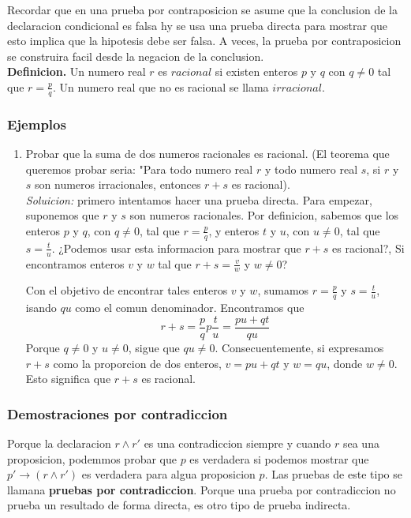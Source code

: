 \documentclass[]{article}
\begin{document}
Recordar que en una prueba por contraposicion se asume que la conclusion de la declaracion condicional es falsa hy se usa una prueba directa para mostrar que esto implica que la hipotesis debe ser falsa. A veces, la prueba por contraposicion se construira facil desde la negacion de la conclusion.\\

\textbf{Definicion.} Un numero real $r$ es $racional$ si existen enteros $p$ y $q$ con $q \neq 0$ tal que $r = \frac{p}{q}$. Un numero real que no es racional se llama $irracional$.

\subsubsection*{Ejemplos}

\begin{enumerate}
	\item Probar que la suma de dos numeros racionales es racional. (El teorema que queremos probar seria: "Para todo numero real $r$ y todo numero real $s$, si $r$ y $s$ son numeros irracionales, entonces $r + s$ es racional).\\
	\textit{Soluicion:} primero intentamos hacer una prueba directa. Para empezar, suponemos que $r$ y $s$ son numeros racionales. Por definicion, sabemos que los enteros $p$ y $q$, con $q \neq 0$, tal que $r = \frac{p}{q}$, y enteros $t$ y $u$, con $u \neq 0$, tal que $s = \frac{t}{u}$. ¿Podemos usar esta informacion para mostrar que $r + s$ es racional?, Si encontramos enteros $v$ y $w$ tal que $r + s = \frac{v}{w}$ y $w \neq 0$?

	Con el objetivo de encontrar tales enteros $v$ y $w$, sumamos $r = \frac{p}{q}$ y $s = \frac{t}{u}$, isando $qu$ como el comun denominador. Encontramos que
	\begin{equation}
		r + s = \frac{p}{q} p \frac{t}{u} = \frac{pu + qt}{qu}
	\end{equation}
	Porque $q \neq 0$ y $u \neq 0$, sigue que $qu \neq 0$. Consecuentemente, si expresamos $r + s$ como la proporcion de dos enteros, $v = pu + qt$ y $w = qu$, donde $w \neq 0$. Esto significa que $r + s$ es racional. 
\end{enumerate}

\subsubsection*{Demostraciones por contradiccion}

Porque la declaracion $r \wedge r'$ es una contradiccion siempre y cuando  $r$ sea una proposicion, podemmos probar que $p$ es verdadera si podemos mostrar que $p' \rightarrow (r \wedge r')$ es verdadera para algua proposicion $p$. Las pruebas de este tipo se llamana \textbf{pruebas por contradiccion}. Porque una prueba por contradiccion no prueba un resultado de forma directa, es otro tipo de prueba indirecta.
\end{document}
